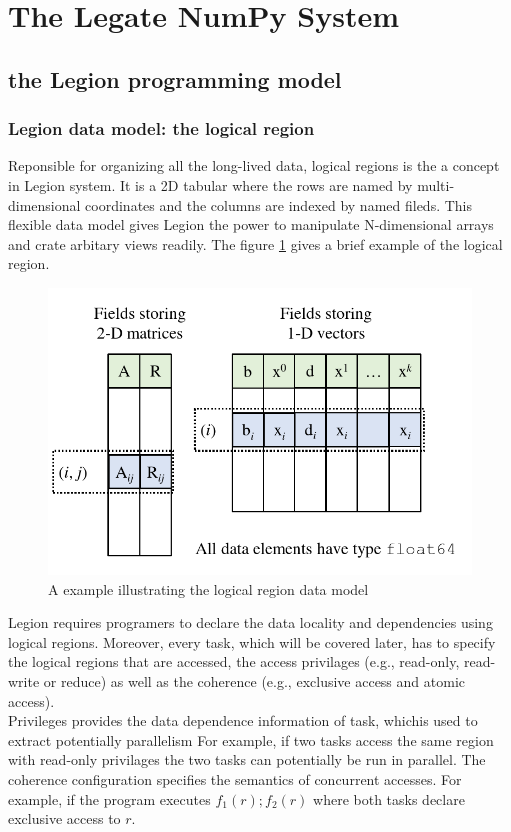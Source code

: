 \documentclass{article}
\newenvironment{newSec}[1]{
	\section{#1}
	\lhead{#1}
}{ \newpage }
\newenvironment{newSubsec}[1]{
	\subsection{#1}
}{}
\begin{document}
\begin{newSec}{The Legate NumPy System}
\begin{newSubsec}{the Legion programming model}
		\subsubsection{Legion data model: the logical region}
		Reponsible for organizing all the long-lived data, logical regions is the a concept in Legion system.
		It is a 2D tabular where the rows are named by multi-dimensional coordinates and the columns are indexed by named fileds.
		This flexible data model gives Legion the power to manipulate N-dimensional arrays and crate arbitary views readily.
		The figure \ref{fig:logical-region} gives a brief example of the logical region.\par
		\begin{figure}[htbp]
			\centering
			\includegraphics{fig/logical-region.png}
			\caption{{A example illustrating the logical region data model}\cite{Legate}}
			\label{fig:logical-region}
		\end{figure}
		Legion requires programers to declare the data locality and dependencies using logical regions.
		Moreover, every task, which will be covered later, has to specify the logical regions that are accessed,
		the access privilages (e.g., read-only, read-write or reduce) as well as the coherence (e.g., exclusive access and atomic access).\\
		Privileges provides the data dependence information of task, whichis used to extract potentially parallelism
		For example, if two tasks access the same region with read-only privilages the two tasks can potentially be run in parallel.
		The coherence configuration specifies the semantics of concurrent accesses.
		For example, if the program executes $f_1(r); f_2(r)$ where both tasks  declare exclusive access to $r$.

\end{newSubsec}
\end{newSec}
\end{document}
